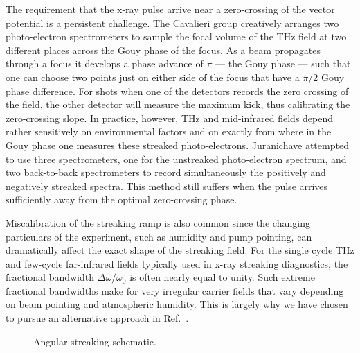 The requirement that the x-ray pulse arrive near a zero-crossing of the vector potential is a persistent challenge.
The Cavalieri group creatively arranges two photo-electron spectrometers to sample the focal volume of the THz field at two different places across the Gouy phase of the focus.
As a beam propagates through a focus it develops a phase advance of $\pi$ --- the Gouy phase --- such that one can choose two points just on either side of the focus that have a $\pi$/2 Gouy phase difference.
For shots when one of the detectors records the zero crossing of the field, the other detector will measure the maximum kick, thus calibrating the zero-crossing slope.
In practice, however, THz and mid-infrared fields depend rather sensitively on environmental factors and on exactly from where in the Gouy phase one measures these streaked photo-electrons.
Juranic\etal have attempted to use three spectrometers, one for the unstreaked photo-electron spectrum, and two back-to-back spectrometers to record simultaneously the positively and negatively streaked spectra.
This method still suffers when the pulse arrives sufficiently away from the optimal zero-crossing phase.




Miscalibration of the streaking ramp is also common since the changing particulars of the experiment, such as humidity and pump pointing, can dramatically affect the exact shape of the streaking field.
For the single cycle THz and few-cycle far-infrared fields typically used in x-ray streaking diagnostics, the fractional bandwidth $\Delta\omega/\omega_0$ is often nearly equal to unity.
Such extreme fractional bandwidths make for very irregular carrier fields that vary depending on beam pointing and atmospheric humidity.
This is largely why we have chosen to pursue an alternative approach in Ref.~\cite{Nick2016}.

\begin{wrapfigure}[15]{r}{.5\linewidth}
\vspace{-.5\baselineskip}
\caption{\label{NickScheme}
Angular streaking schematic.
}
\end{wrapfigure}

